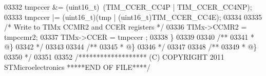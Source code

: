 \begin{DoxyCode}
03332   tmpccer &= (uint16\_t)~(TIM_CCER_CC4P | TIM_CCER_CC4NP);
03333   tmpccer |= (uint16\_t)(tmp | (uint16\_t)TIM_CCER_CC4E);
03334 
03335   \textcolor{comment}{/* Write to TIMx CCMR2 and CCER registers */}
03336   TIMx->CCMR2 = tmpccmr2;
03337   TIMx->CCER = tmpccer ;
03338 \}
03339 
03340 \textcolor{comment}{/**}
03341 \textcolor{comment}{  * @\}}
03342 \textcolor{comment}{  */}
03343 
03344 \textcolor{comment}{/**}
03345 \textcolor{comment}{  * @\}}
03346 \textcolor{comment}{  */}
03347 
03348 \textcolor{comment}{/**}
03349 \textcolor{comment}{  * @\}}
03350 \textcolor{comment}{  */}
03351 
03352 \textcolor{comment}{/******************* (C) COPYRIGHT 2011 STMicroelectronics *****END OF FILE****/}
\end{DoxyCode}
